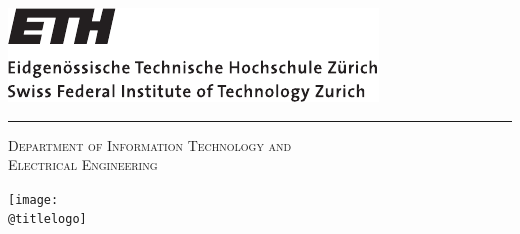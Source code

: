 \begin{titlepage}

 \thispagestyle{empty}

 \begin{center}
  \begin{minipage}[b]{0.45\linewidth}
   \vspace{0pt}	
   \includegraphics[width=0.8\linewidth]{./figures/eth_logo}
  \end{minipage}\hfill
  \begin{minipage}{0.45\textwidth}
   \vspace{-0.55cm}
  \end{minipage}

  \vspace{0.1cm}

  \hspace*{0.15cm}\rule{0.985\textwidth}{0.4pt}

  \vspace{0.5cm}

  {\Large\textsc{Department of Information Technology and \\Electrical Engineering}}

  \vspace{0.2cm}

  \show@semester

  \vfill

  \begin{spacing}{2.0}
  {\Huge\textbf{\@title}}
  \end{spacing}

  \vspace{0.2cm}

  \show@reporttype

  \vfill
  
  \ifx\@titlelogo\@empty
   \relax
  \else
   \texttt{[image: \\@titlelogo]}
  \fi
    

\end{center}
\end{titlepage}
